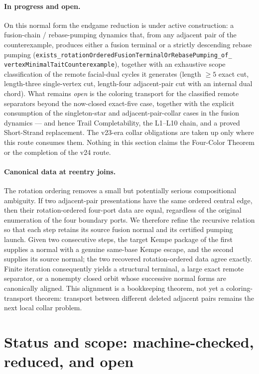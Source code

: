 \documentclass[11pt]{article}
\theoremstyle{definition}
\begin{document}
\paragraph{In progress and open.} On this normal form the endgame reduction is
under active construction: a fusion-chain / rebase-pumping dynamics that, from
any adjacent pair of the counterexample, produces either a fusion terminal or
a strictly descending rebase pumping
(\texttt{exists\_rotationOrderedFusionTerminalOrRebasePumping\_of\_}%
\texttt{vertexMinimalTaitCounterexample}), together with an exhaustive scope
classification of the remote facial-dual cycles it generates (length $\geq5$
exact cut, length-three single-vertex cut, length-four adjacent-pair cut with
an internal dual chord). What remains \emph{open} is the coloring transport
for the classified remote separators beyond the now-closed exact-five case,
together with the explicit consumption of the singleton-star and
adjacent-pair-collar cases in the fusion dynamics --- and hence Trail
Completability, the L1--L10 chain, and a proved Short-Strand replacement. The
v23-era collar obligations are taken up only where this route consumes them.
Nothing in this section claims the Four-Color Theorem or the completion of the
v24 route.

\paragraph{Canonical data at reentry joins.}
The rotation ordering removes a small but potentially serious compositional
ambiguity.  If two adjacent-pair presentations have the same ordered central
edge, then their rotation-ordered four-port data are equal, regardless of the
original enumeration of the four boundary ports.  We therefore refine the
recursive relation so that each step retains its source fusion normal and its
certified pumping launch.  Given two consecutive steps, the target Kempe
package of the first supplies a normal with a genuine same-base Kempe escape,
and the second supplies its source normal; the two recovered rotation-ordered
data agree exactly.  Finite iteration consequently yields a structural
terminal, a large exact remote separator, or a nonempty closed orbit whose
successive normal forms are canonically aligned.  This alignment is a
bookkeeping theorem, not yet a coloring-transport theorem: transport between
different deleted adjacent pairs remains the next local collar problem.

\section{Status and scope: machine-checked, reduced, and open}
\label{sec:status}
\end{document}
